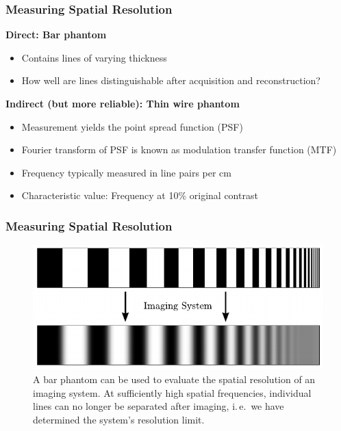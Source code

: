\begin{frame}
	\frametitle{Measuring Spatial Resolution}

	\textcolor{faublue}{\textbf{Direct: Bar phantom}}
	\vspace{0.3cm}
	\begin{itemize}
		\setlength\itemsep{0.2cm}
		\item Contains lines of varying thickness
		\item How well are lines distinguishable after acquisition and reconstruction?
	\end{itemize}

	\vspace{0.5cm}
	\textcolor{faublue}{\textbf{Indirect (but more reliable): Thin wire phantom}}
	\vspace{0.3cm}
	\begin{itemize}
		\setlength\itemsep{0.2cm}
		\item Measurement yields the point spread function (PSF)
		\item Fourier transform of PSF is known as modulation transfer function (MTF)
		\item Frequency typically measured in line pairs per cm
		\item Characteristic value: Frequency at 10\% original contrast
	\end{itemize}

\end{frame}

\begin{frame}
	\frametitle{Measuring Spatial Resolution}

	\begin{figure}
		\begin{center}
			\includegraphics[width=0.6\linewidth]{images/resolution_2}
		\end{center}
		\caption{A bar phantom can be used to evaluate the spatial resolution of an imaging system. At sufficiently high spatial frequencies, individual lines can no longer be separated after imaging, i.\,e.~we have determined the system's resolution limit.}
		\label{fig:ct_resolution_2}
	\end{figure}

\end{frame}



